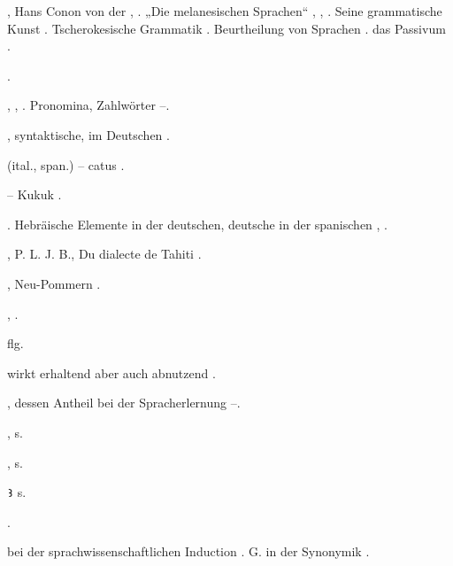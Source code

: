 \begin{register}
, Hans Conon von der \pageref{sp.30}, \pageref{sp.49}. „Die melanesischen Sprachen“ \pageref{sp.74}, \sed{\pageref{sp.151},} \pageref{sp.280}, \pageref{sp.406}. Seine grammatische Kunst \pageref{sp.112}. Tscherokesische Grammatik \pageref{sp.358}.  Beurtheilung von Sprachen \pageref{sp.427}.  das Passivum \pageref{sp.481}.


 \pageref{sp.248}.

 \pageref{sp.142}, \pageref{sp.282}, \pageref{sp.307}. Pronomina, Zahlwörter \pageref{sp.160}–\pageref{sp.161}.

, syntaktische, im Deutschen \sed{\pageref{sp.243},} \pageref{sp.272}.

 (ital., span.) – catus \pageref{sp.190}.


 – Kukuk \pageref{sp.208}.

 \pageref{sp.45}. Hebräische Elemente in der deutschen, deutsche in der spanischen \pageref{sp.288}, \pageref{sp.289}.

, P. L. J. B., Du dialecte de Tahiti \pageref{sp.463}.

, Neu-Pommern \pageref{sp.165}.

 \pageref{sp.2}, \pageref{sp.311}.


 \pageref{sp.319} flg.

 wirkt erhaltend aber auch abnutzend \pageref{sp.182}.

, dessen Antheil bei der Spracherlernung \pageref{sp.63}–\pageref{sp.64}.

, s. 


, s. 

\texttt{Ꜣ} \sed{\pageref{sp.282},} s. 

 \pageref{sp.45}.

 bei der sprachwissenschaftlichen Induction \pageref{sp.48}. G. in der Synonymik \pageref{sp.100}.


\end{register}
